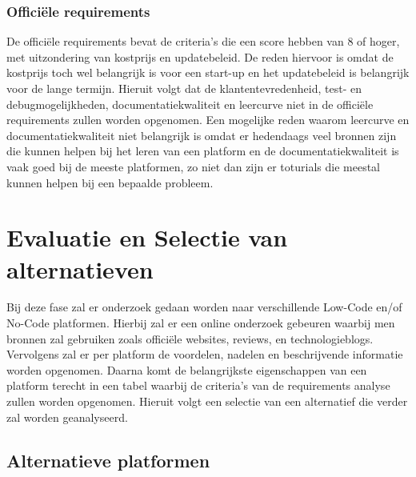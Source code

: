 \subsubsection*{Officiële requirements}
De officiële requirements bevat de criteria's die een score hebben van 8 of hoger, met uitzondering van kostprijs en updatebeleid. De reden hiervoor is omdat de kostprijs toch wel belangrijk
is voor een start-up en het updatebeleid is belangrijk voor de lange termijn. Hieruit volgt dat de klantentevredenheid, test- en debugmogelijkheden, documentatiekwaliteit en leercurve niet in de officiële requirements zullen worden opgenomen.
Een mogelijke reden waarom leercurve en documentatiekwaliteit niet belangrijk is omdat er hedendaags veel bronnen zijn die kunnen helpen bij het leren van een platform en de documentatiekwaliteit is vaak goed bij de meeste platformen, zo niet dan zijn er 
toturials die meestal kunnen helpen bij een bepaalde probleem.



\section*{Evaluatie en Selectie van alternatieven}
\label{sec:evaluatie-en-selectie-van-alternatieven}
Bij deze fase zal er onderzoek gedaan worden naar verschillende Low-Code en/of No-Code platformen. Hierbij zal 
er een online onderzoek gebeuren waarbij men bronnen zal gebruiken zoals officiële websites, reviews, en technologieblogs.
Vervolgens zal er per platform de voordelen, nadelen en beschrijvende informatie worden opgenomen. Daarna komt de belangrijkste
eigenschappen van een platform terecht in een tabel waarbij de criteria's van de requirements analyse zullen worden opgenomen. Hieruit volgt een
selectie van een alternatief die verder zal worden geanalyseerd.
\subsection*{Alternatieve platformen}
\label{subsec:alternatieve-platformen}

